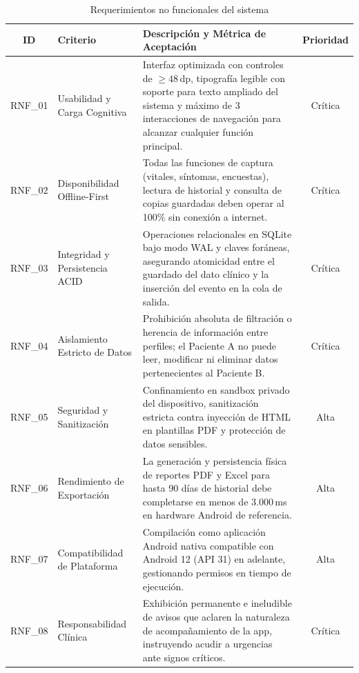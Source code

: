 \begin{table}[H]
\centering
\renewcommand{\arraystretch}{1.3}
\setlength{\tabcolsep}{6pt}
\begin{tabularx}{\textwidth}{|c|p{3.2cm}|X|c|}
\hline
\textbf{ID} & \textbf{Criterio} & \textbf{Descripción y Métrica de Aceptación} & \textbf{Prioridad} \\ \hline
RNF\_01 & Usabilidad y Carga Cognitiva & Interfaz optimizada con controles de $\ge 48$\,dp, tipografía legible con soporte para texto ampliado del sistema y máximo de 3 interacciones de navegación para alcanzar cualquier función principal. & Crítica \\ \hline
RNF\_02 & Disponibilidad Offline-First & Todas las funciones de captura (vitales, síntomas, encuestas), lectura de historial y consulta de copias guardadas deben operar al 100\% sin conexión a internet. & Crítica \\ \hline
RNF\_03 & Integridad y Persistencia ACID & Operaciones relacionales en SQLite bajo modo WAL y claves foráneas, asegurando atomicidad entre el guardado del dato clínico y la inserción del evento en la cola de salida. & Crítica \\ \hline
RNF\_04 & Aislamiento Estricto de Datos & Prohibición absoluta de filtración o herencia de información entre perfiles; el Paciente A no puede leer, modificar ni eliminar datos pertenecientes al Paciente B. & Crítica \\ \hline
RNF\_05 & Seguridad y Sanitización & Confinamiento en sandbox privado del dispositivo, sanitización estricta contra inyección de HTML en plantillas PDF y protección de datos sensibles. & Alta \\ \hline
RNF\_06 & Rendimiento de Exportación & La generación y persistencia física de reportes PDF y Excel para hasta 90 días de historial debe completarse en menos de 3.000\,ms en hardware Android de referencia. & Alta \\ \hline
RNF\_07 & Compatibilidad de Plataforma & Compilación como aplicación Android nativa compatible con Android 12 (API 31) en adelante, gestionando permisos en tiempo de ejecución. & Alta \\ \hline
RNF\_08 & Responsabilidad Clínica & Exhibición permanente e ineludible de avisos que aclaren la naturaleza de acompañamiento de la app, instruyendo acudir a urgencias ante signos críticos. & Crítica \\ \hline
\end{tabularx}
\caption{Requerimientos no funcionales del sistema}
\label{tab:rnf}
\end{table}

